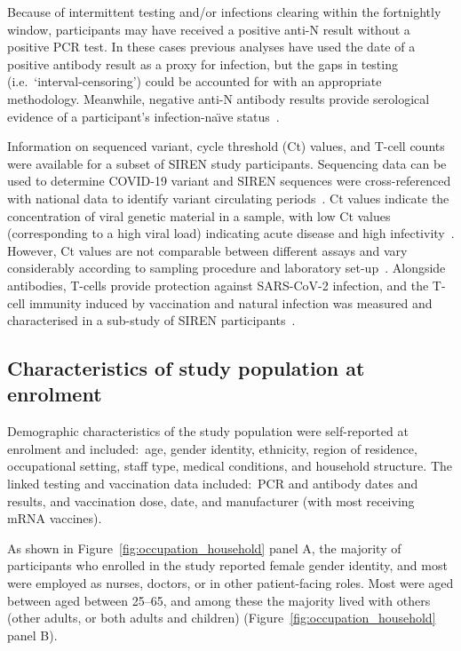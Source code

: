 Because of intermittent testing and/or infections clearing within the fortnightly window, participants may have received a positive anti-N result without a positive PCR test. In these cases previous analyses have used the date of a positive antibody result as a proxy for infection, but the gaps in testing (i.e.\ `interval-censoring') could be accounted for with an appropriate methodology. Meanwhile, negative anti-N antibody results provide serological evidence of a participant's infection-na\"{\i}ve status~\parencite{UK_Health_Security_Agency2022-ps}.

Information on sequenced variant, cycle threshold (Ct) values, and T-cell counts were available for a subset of SIREN study participants. Sequencing data can be used to determine COVID-19 variant and SIREN sequences were cross-referenced with national data to identify variant circulating periods~\parencite{UK_Government2021-ip}. Ct values indicate the concentration of viral genetic material in a sample, with low Ct values (corresponding to a high viral load) indicating acute disease and high infectivity~\parencite{Public_Health_England2020-it}. However, Ct values are not comparable between different assays and vary considerably according to sampling procedure and laboratory set-up~\parencite{Dahdouh2021-jk}. Alongside antibodies, T-cells provide protection against SARS-CoV-2 infection, and the T-cell immunity induced by vaccination and natural infection was measured and characterised in a sub-study of SIREN participants~\parencite{Angyal2022-nl}.

\subsection{Characteristics of study population at enrolment}

Demographic characteristics of the study population were self-reported at enrolment and included:\ age, gender identity, ethnicity, region of residence, occupational setting, staff type, medical conditions, and household structure. The linked testing and vaccination data included:\ PCR and antibody dates and results, and vaccination dose, date, and manufacturer (with most receiving mRNA vaccines).

As shown in Figure~\ref{fig:occupation_household} panel A, the majority of participants who enrolled in the study reported female gender identity, and most were employed as nurses, doctors, or in other patient-facing roles. Most were aged between aged between 25--65, and among these the majority lived with others (other adults, or both adults and children) (Figure~\ref{fig:occupation_household} panel B).

